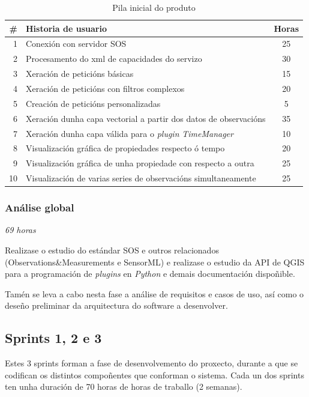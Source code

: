\begin{table}
\centering
\begin{tabularx}{\textwidth}{rXc} \toprule
	\# & Historia de usuario & Horas \\
	\midrule
	1 & Conexión con servidor SOS & 25 \\
	2 & Procesamento do xml de capacidades do servizo & 30 \\
	3 & Xeración de peticións básicas & 15 \\
	4 & Xeración de peticións con filtros complexos & 20 \\
	5 & Creación de peticións personalizadas & 5 \\
	6 & Xeración dunha capa vectorial a partir dos datos de observacións & 35\\
	7 & Xeración dunha capa válida para o \emph{plugin} \emph{TimeManager} & 10\\
	8 & Visualización gráfica de propiedades respecto ó tempo & 20\\
	9 & Visualización gráfica de unha propiedade con respecto a outra & 25\\
	10 & Visualización de varias series de observacións simultaneamente & 25\\
	\bottomrule
\end{tabularx}
\caption{Pila inicial do produto}
\label{tab:productBacklog}
\end{table}

\subsubsection{Análise global}
\textit{69 horas}

Realizase o estudio do estándar SOS e outros relacionados (Observations\&Measurements e SensorML) e realizase o estudio da API de QGIS\cite{APIQGIS} para a programación de \emph{plugins} en \emph{Python} e demais documentación dispoñible\cite{PyQGIS}.

Tamén se leva a cabo nesta fase a análise de requisitos e casos de uso, así como o deseño preliminar da arquitectura do software a desenvolver.

\subsection{Sprints 1, 2 e 3}
Estes 3 sprints forman a fase de desenvolvemento do proxecto, durante a que se codifican os distintos compoñentes que conforman o sistema. Cada un dos sprints ten unha duración de 70 horas de horas de traballo (2 semanas).

